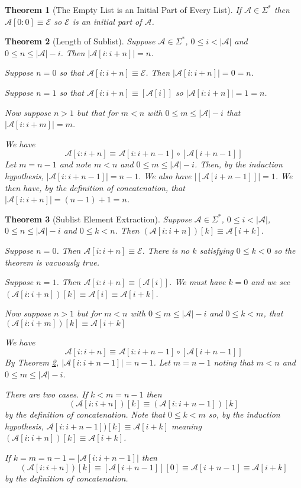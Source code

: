 \documentclass[12pt]{article}
\theoremstyle{break}
\theoremstyle{break}
\newtheorem{theorem}{Theorem}[section]
\theoremstyle{break}
\theoremstyle{break}
\theoremstyle{break}
\newtheorem{informal definition}[definition]{Informal Definition}
\newcommand{\mc}[1]{\mathcal{#1}}
\begin{document}
\begin{theorem}[The Empty List is an Initial Part of Every List]
\label{thm:list:emptylistisinitpart}
If $\mc{A}\in\Sigma^*$ then $\mc{A}[0:0] \equiv \mc{E}$ so $\mc{E}$ is an initial part of $\mc{A}$.
\end{theorem}

\begin{theorem}[Length of Sublist]
\label{thm:list:lensublist}
Suppose $\mc{A}\in\Sigma^*$, $0\le i < |\mc{A}|$ and $0\le n \le |\mc{A}|-i$.
Then $|\mc{A}[i:i+n]| = n$.

Suppose $n=0$ so that $\mc{A}[i:i+n] \equiv \mc{E}$.
Then $|\mc{A}[i:i+n]| = 0 = n$.

Suppose $n=1$ so that $\mc{A}[i:i+n] \equiv [\mc{A}[i]]$ so $|\mc{A}[i:i+n]| =1 = n$.

Now suppose $n>1$ but that for $m<n$ with $0\le m \le |\mc{A}|-i$ that $|\mc{A}[i:i+m]| = m$.

We have
$$
\mc{A}[i:i+n] \equiv \mc{A}[i:i+n-1]\circ[\mc{A}[i+n-1]]
$$
Let $m=n-1$ and note $m<n$ and $0\le m \le |\mc{A}|-i$.
Then, by the induction hypothesis, $|\mc{A}[i:i+n-1]|= n-1$.
We also have $|[\mc{A}[i+n-1]]|=1$.
We then have, by the definition of concatenation, that $|\mc{A}[i:i+n]| = (n-1)+1 = n$.
\end{theorem}

\begin{theorem}[Sublist Element Extraction]
\label{thm:list:sublistelementextraction}
Suppose $\mc{A}\in\Sigma^*$, $0\le i < |\mc{A}|$, $0\le n \le |\mc{A}|-i$ and $0\le k < n$.
Then $(\mc{A}[i:i+n])[k] \equiv \mc{A}[i+k]$.

Suppose $n=0$.
Then $\mc{A}[i:i+n] \equiv \mc{E}$.
There is no $k$ satisfying $0\le k < 0$ so the theorem is vacuously true.

Suppose $n=1$.
Then $\mc{A}[i:i+n] \equiv [\mc{A}[i]]$.
We must have $k=0$ and we see $(\mc{A}[i:i+n])[k] \equiv \mc{A}[i]\equiv \mc{A}[i+k]$.

Now suppose $n>1$ but for $m<n$ with $0\le m \le |\mc{A}|-i$ and $0\le k < m$, that $(\mc{A}[i:i+m])[k] \equiv \mc{A}[i+k]$

We have
$$
\mc{A}[i:i+n]\equiv \mc{A}[i:i+n-1] \circ [\mc{A}[i+n-1]]
$$
By Theorem \ref{thm:list:lensublist}, $|\mc{A}[i:i+n-1]| = n-1$.
Let $m=n-1$ noting that $m<n$ and $0\le m \le |\mc{A}|-i$.

There are two cases.
If $k < m = n-1$ then
$$
(\mc{A}[i:i+n])[k] \equiv (\mc{A}[i:i+n-1])[k]
$$
by the definition of concatenation.
Note that $0\le k < m$ so, by the induction hypothesis, $\mc{A}[i:i+n-1])[k]\equiv \mc{A}[i+k]$ meaning $(\mc{A}[i:i+n])[k] \equiv \mc{A}[i+k]$.

If $k=m=n-1=|\mc{A}[i:i+n-1]|$ then
$$
(\mc{A}[i:i+n])[k] \equiv [\mc{A}[i+n-1]][0] \equiv \mc{A}[i+n-1] \equiv \mc{A}[i+k]
$$
by the definition of concatenation.

\end{theorem}
\end{document}

